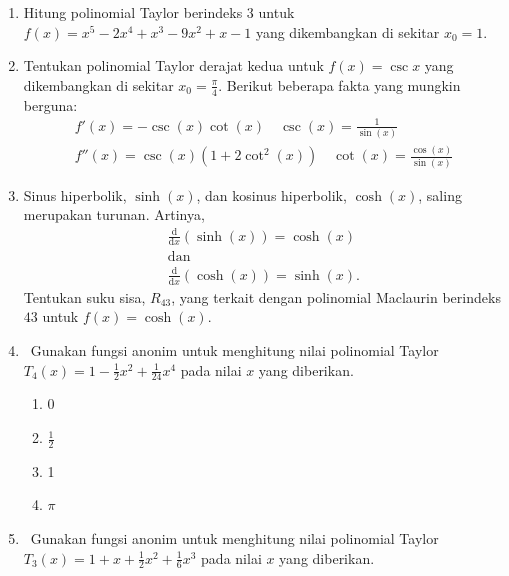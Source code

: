 \begin{enumerate}
\begin{enumerate}
\item Tuliskan polinomial Taylor derajat ketiga untuk $f(x)$ yang dikembangkan
di sekitar $x_{0}=2$.
\item Gunakan polinomial Taylor tersebut untuk menghampiri $f(4)$.
\item Tentukan suatu batas atas bagi galat mutlak hampiran tersebut dengan
memanfaatkan fakta bahwa
\[
-3\leq f^{(4)}(\xi)\leq5
\]
untuk setiap $\xi\in[2,4]$.
\end{enumerate}
\item Hitung polinomial Taylor berindeks $3$ untuk $f(x)=x^{5}-2x^{4}+x^{3}-9x^{2}+x-1$
yang dikembangkan di sekitar $x_{0}=1$.
\item Tentukan polinomial Taylor derajat kedua untuk $f(x)=\csc x$ yang
dikembangkan di sekitar ${\displaystyle x_{0}=\frac{\pi}{4}}$. Berikut
beberapa fakta yang mungkin berguna:
\begin{gather*}
f'(x)=-\csc(x)\cot(x)\quad\csc(x)=\frac{1}{\sin(x)}\\
f''(x)=\csc(x)(1+2\cot^{2}(x))\quad\cot(x)=\frac{\cos(x)}{\sin(x)}
\end{gather*}
\item Sinus hiperbolik, $\sinh(x)$, dan kosinus hiperbolik, $\cosh(x)$,
saling merupakan turunan. Artinya, 
\[
\begin{gathered}\frac{\textrm{d}}{\textrm{d}x}(\sinh(x))=\cosh(x)\\
\textrm{dan}\\
\frac{\textrm{d}}{\textrm{d}x}(\cosh(x))=\sinh(x).
\end{gathered}
\]
Tentukan suku sisa, $R_{43}$, yang terkait dengan polinomial Maclaurin
berindeks $43$ untuk $f(x)=\cosh(x)$. 
\item \octave\ \label{exc:taylor8}Gunakan fungsi anonim untuk menghitung
nilai polinomial Taylor $T_{4}(x)=1-\frac{1}{2}x^{2}+\frac{1}{24}x^{4}$
pada nilai $x$ yang diberikan. \hasasolution 

\begin{enumerate}
\item 0
\item $\frac{1}{2}$
\item 1
\item $\pi$
\end{enumerate}
\item \octave\ \label{exc:taylor10}Gunakan fungsi anonim untuk menghitung
nilai polinomial Taylor $T_{3}(x)=1+x+\frac{1}{2}x^{2}+\frac{1}{6}x^{3}$
pada nilai $x$ yang diberikan.


\end{enumerate}
